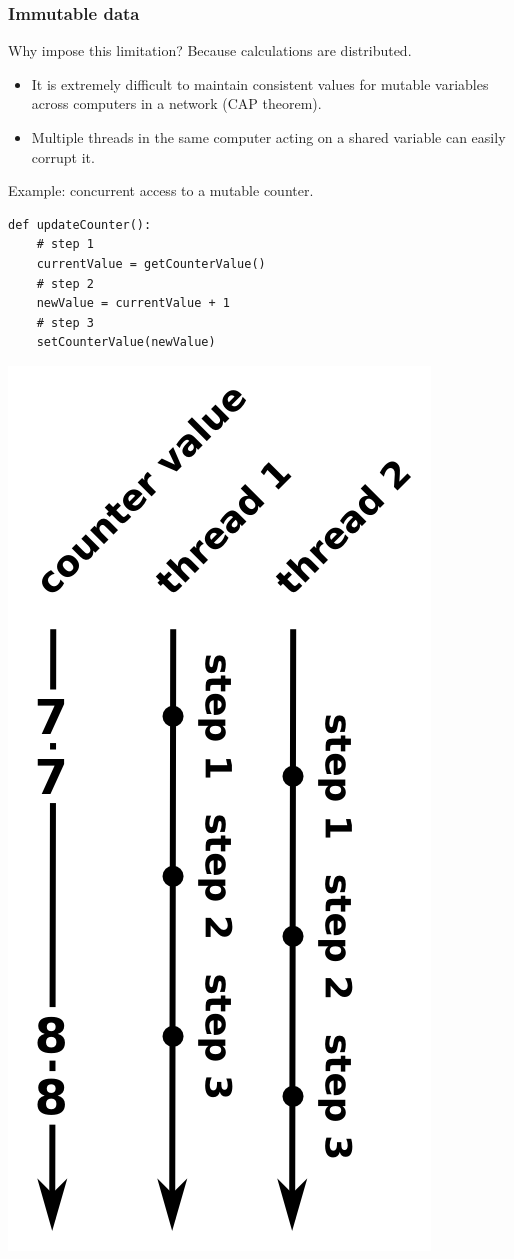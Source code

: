 \documentclass[compress]{beamer}
\begin{document}
\begin{frame}[fragile]
\frametitle{Immutable data}

Why impose this limitation? Because calculations are distributed.

\begin{itemize}
\item It is extremely difficult to maintain consistent values for mutable variables across computers in a network (CAP theorem).
\item Multiple threads in the same computer acting on a shared variable can easily corrupt it.
\end{itemize}

\vspace{0.75 cm}
Example: concurrent access to a mutable counter.

\begin{lstlisting}
def updateCounter():
    # step 1
    currentValue = getCounterValue()
    # step 2
    newValue = currentValue + 1
    # step 3
    setCounterValue(newValue)
\end{lstlisting}

\vspace{-4.5 cm}
\hfill \includegraphics[width=0.23\linewidth]{PLOTS/time_mutable.png}
\end{frame}
\end{document}
